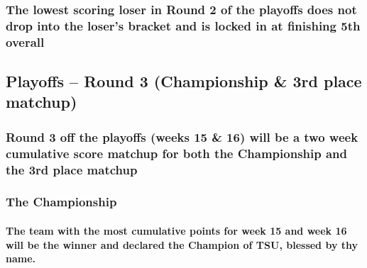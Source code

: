 \documentclass[
]{book}
\begin{document}
\hypertarget{the-lowest-scoring-loser-in-round-2-of-the-playoffs-does-not-drop-into-the-losers-bracket-and-is-locked-in-at-finishing-5th-overall}{%
\subsubsection{The lowest scoring loser in Round 2 of the playoffs does not drop into the loser's bracket and is locked in at finishing 5th overall}\label{the-lowest-scoring-loser-in-round-2-of-the-playoffs-does-not-drop-into-the-losers-bracket-and-is-locked-in-at-finishing-5th-overall}}

\hypertarget{playoffs-round-3-championship-3rd-place-matchup}{%
\subsection{Playoffs -- Round 3 (Championship \& 3rd place matchup)}\label{playoffs-round-3-championship-3rd-place-matchup}}

\hypertarget{round-3-off-the-playoffs-weeks-15-16-will-be-a-two-week-cumulative-score-matchup-for-both-the-championship-and-the-3rd-place-matchup}{%
\subsubsection{Round 3 off the playoffs (weeks 15 \& 16) will be a two week cumulative score matchup for both the Championship and the 3rd place matchup}\label{round-3-off-the-playoffs-weeks-15-16-will-be-a-two-week-cumulative-score-matchup-for-both-the-championship-and-the-3rd-place-matchup}}

\hypertarget{the-championship}{%
\subsubsection{The Championship}\label{the-championship}}

\hypertarget{the-team-with-the-most-cumulative-points-for-week-15-and-week-16-will-be-the-winner-and-declared-the-champion-of-tsu-blessed-by-thy-name.}{%
\paragraph{The team with the most cumulative points for week 15 and week 16 will be the winner and declared the Champion of TSU, blessed by thy name.}\label{the-team-with-the-most-cumulative-points-for-week-15-and-week-16-will-be-the-winner-and-declared-the-champion-of-tsu-blessed-by-thy-name.}}
\end{document}
